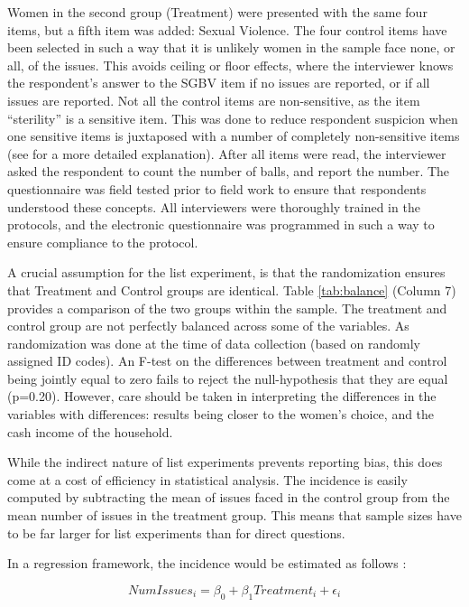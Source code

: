 \documentclass[10pt,a4paper]{scrartcl} %
\begin{document}
Women in the second group (Treatment) were presented with the same four items, but a fifth item was added: Sexual Violence.  The four control items have been selected in such a way that it is unlikely women in the sample face none, or all, of the issues. This avoids ceiling or floor effects, where the interviewer knows the respondent's answer to the SGBV item if no issues are reported, or if all issues are reported. Not all the control items are non-sensitive, as the item ``sterility'' is a sensitive item. This was done to reduce respondent suspicion when one sensitive items is juxtaposed with a number of completely non-sensitive items (see \citet{Chuang2019} for a more detailed explanation). After all items were read, the interviewer asked the respondent to count the number of balls, and report the number. The questionnaire was field tested prior to field work to ensure that respondents understood these concepts. All interviewers were thoroughly trained in the protocols, and the electronic questionnaire was programmed in such a way to ensure compliance to the protocol.

A crucial assumption for the list experiment, is that the randomization ensures that Treatment and Control groups are identical. Table \ref{tab:balance} (Column 7) provides a comparison of the two groups within the sample. The treatment and control group are not perfectly balanced across some of the variables. As randomization was done at the time of data collection (based on randomly assigned ID codes). An F-test on the differences between treatment and control being jointly equal to zero fails to reject the null-hypothesis that they are equal (p=0.20). However, care should be taken in interpreting the differences in the variables with differences: results being closer to the women's choice, and the cash income of the household. 

While the indirect nature of list experiments prevents reporting bias, this does come at a cost of efficiency in statistical analysis. The incidence is easily computed by subtracting the mean of issues faced in the control group from the mean number of issues in the treatment group. This means that sample sizes have to be far larger for list experiments than for direct questions. 

In a regression framework, the incidence would be estimated as follows \cite{Holbrook2010}:

\begin{equation}
\label{eq:basic}
NumIssues_i = \beta_0 + \beta_1 Treatment_i + \epsilon_i
\end{equation}
\end{document}
